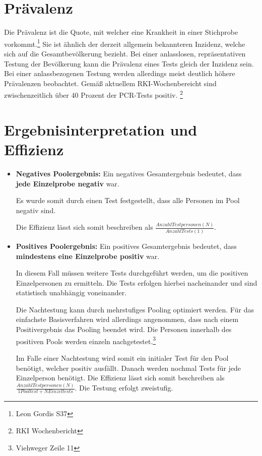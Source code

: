 \section{Prävalenz}%
Die Prävalenz ist die Quote, mit welcher eine Krankheit in einer Stichprobe vorkommt.\footnote{Leon Gordis S37}
Sie ist ähnlich der derzeit allgemein bekannteren Inzidenz, welche sich auf die Gesamtbevölkerung bezieht.
Bei einer anlasslosen, repräsentativen Testung der Bevölkerung kann die Prävalenz eines Tests gleich der Inzidenz sein.
Bei einer anlassbezogenen Testung werden allerdings meist deutlich höhere Prävalenzen beobachtet.
Gemäß aktuellem RKI-Wochenbereicht sind zwischenzeitlich über 40 Prozent der PCR-Tests positiv.
\footnote{RKI Wochenbericht}

\section{Ergebnisinterpretation und Effizienz}
\begin{itemize}
	\item \textbf{Negatives Poolergebnis:}\newline
	Ein negatives Gesamtergebnis bedeutet, dass \textbf{jede Einzelprobe negativ} war.
	
	Es wurde somit durch einen Test festgestellt, dass alle Personen im Pool negativ sind.
	
	Die Effizienz lässt sich somit beschreiben als $\frac{Anzahl Testpersonen (N)}{Anzahl Tests (1)} $.
	
	\item \textbf{Positives Poolergebnis:}\newline
	Ein positives Gesamtergebnis bedeutet, dass \textbf{mindestens eine Einzelprobe positiv} war.
	
	In diesem Fall müssen weitere Tests durchgeführt werden, um die positiven Einzelpersonen zu ermitteln.
	Die Tests erfolgen hierbei nacheinander und sind statistisch unabhängig voneinander.
	
	Die Nachtestung kann durch mehrstufiges Pooling optimiert werden.
	Für das einfachste Basisverfahren wird allerdings angenommen, dass nach einem Positivergebnis das Pooling beendet wird.
	Die Personen innerhalb des positiven Pools werden einzeln nachgetestet.\footnote{Viehweger Zeile 11}
	
	Im Falle einer Nachtestung wird somit ein initialer Test für den Pool benötigt, welcher positiv ausfällt.
	Danach werden nochmal Tests für jede Einzelperson benötigt.
	Die Effizienz lässt sich somit beschreiben als $\frac{Anzahl Testpersonen (N)}{1 Pooltest + N Einzeltests} $.
	Die Testung erfolgt zweistufig.
	
\end{itemize}

